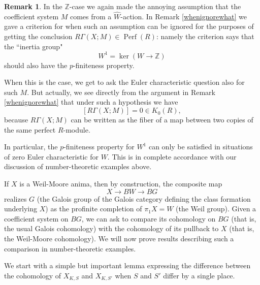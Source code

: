 \documentclass[12pt]{article}
\theoremstyle{definition}
\newtheorem{remark}[theorem]{Remark}
\newcommand{\on}{\operatorname}
\newcommand{\mbb}{\mathbb}
\newcommand{\wh}{\widehat}
\begin{document}
\begin{remark}
In the $\mbb{Z}$-case we again made the annoying assumption that the coefficient system $M$ comes from a $\wh{W}$-action.  In Remark \ref{whenignorewhat} we gave a criterion for when such an assumption can be ignored for the purposes of getting the conclusion $R\Gamma(X;M)\in\on{Perf}(R)$: namely the criterion says that the ``inertia group"
$$W^1 = \on{ker}(W\to\mbb{Z})$$
should also have the $p$-finiteness property.

When this is the case, we get to ask the Euler characteristic question also for such $M$.  But actually, we see directly from the argument in Remark \ref{whenignorewhat} that under such a hypothesis we have
$$[R\Gamma(X;M)] = 0 \in K_0(R),$$
because $R\Gamma(X;M)$ can be written as the fiber of a map between two copies of the same perfect $R$-module.

In particular, the $p$-finiteness property for $W^1$ can only be satisfied in situations of zero Euler characteristic for $W$.  This is in complete accordance with our discussion of number-theoretic examples above.
\end{remark}

If $X$ is a Weil-Moore anima, then by construction, the composite map
$$X \to BW \to BG$$
realizes $G$ (the Galois group of the Galois category defining the class formation underlying $X$) as the profinite completion of $\pi_1X=W$ (the Weil group).  Given a coefficient system on $BG$, we can ask to compare its cohomology on $BG$ (that is, the usual Galois cohomology) with the cohomology of its pullback to $X$ (that is, the Weil-Moore cohomology).  We will now prove results describing such a comparison in number-theoretic examples.

We start with a simple but important lemma expressing the difference between the cohomology of $X_{K,S}$ and $X_{K,S'}$ when $S$ and $S'$ differ by a single place.
\end{document}
